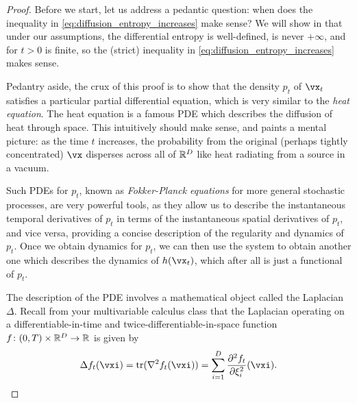 \documentclass[../../book-main.tex]{subfiles}
\begin{document}
\begin{proof}
    Before we start, let us address a pedantic question: when does the inequality in \eqref{eq:diffusion_entropy_increases} make sense? We will show in  that under our assumptions, the differential entropy is well-defined, is never \(+\infty\), and for \(t > 0\) is finite, so the (strict) inequality in \eqref{eq:diffusion_entropy_increases} makes sense.

    Pedantry aside, the crux of this proof is to show that the density \(p_{t}\) of \(\vx_{t}\) satisfies a particular partial differential equation, which is very similar to the \textit{heat equation}. The heat equation is a famous PDE which describes the diffusion of heat through space. This intuitively should make sense, and paints a mental picture: as the time \(t\) increases, the probability from the original (perhaps tightly concentrated) \(\vx\) disperses across all of \(\mathbb{R}^{D}\) like heat radiating from a source in a vacuum.
    
    Such PDEs for \(p_{t}\), known as \textit{Fokker-Planck equations} for more general stochastic processes, are very powerful tools, as they allow us to describe the instantaneous temporal derivatives of \(p_{t}\) in terms of the instantaneous spatial derivatives of \(p_{t}\), and vice versa, providing a concise description of the regularity and dynamics of \(p_{t}\). Once we obtain dynamics for \(p_{t}\), we can then use the system to obtain another one which describes the dynamics of \(h(\vx_{t})\), which after all is just a functional of \(p_{t}\).  

    The description of the PDE involves a mathematical object called the Laplacian \(\Delta\). Recall from your multivariable calculus class that the Laplacian operating on a differentiable-in-time and twice-differentiable-in-space function \(f \colon (0, T) \times \mathbb{R}^{D} \to \mathbb{R}\) is given by
    \begin{equation}
        \Delta f_{t}(\vxi) = \tr(\nabla^{2}f_{t}(\vxi)) = \sum_{i = 1}^{D}\pddv{f_{t}}{\xi_{i}}(\vxi).
    \end{equation}
    

\end{proof}
\end{document}
